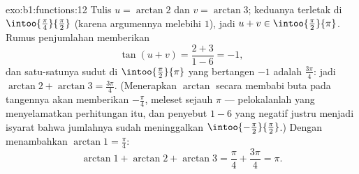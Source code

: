 \begin{solution}{exo:b1:functions:12}
Tulis $u = \arctan 2$ dan $v = \arctan 3$; keduanya terletak di
$\intoo{\frac\pi4}{\frac\pi2}$ (karena argumennya melebihi $1$), jadi $u
+ v \in \intoo{\frac\pi2}{\pi}$. Rumus penjumlahan memberikan
\[
\tan(u + v) = \frac{2 + 3}{1 - 6} = -1 ,
\]
dan satu-satunya sudut di $\intoo{\frac\pi2}{\pi}$ yang bertangen $-1$
adalah $\frac{3\pi}4$: jadi $\arctan 2 + \arctan 3 = \frac{3\pi}4$.
(Menerapkan $\arctan$ secara membabi buta pada tangennya akan memberikan
$-\frac\pi4$, meleset sejauh $\pi$ --- pelokalanlah yang menyelamatkan
perhitungan itu, dan penyebut $1 - 6$ yang negatif justru menjadi
isyarat bahwa jumlahnya sudah meninggalkan
$\intoo{-\frac\pi2}{\frac\pi2}$.) Dengan menambahkan $\arctan 1 = \frac\pi4$:
\[
\arctan 1 + \arctan 2 + \arctan 3 = \frac\pi4 + \frac{3\pi}4 = \pi .
\]
\end{solution}

